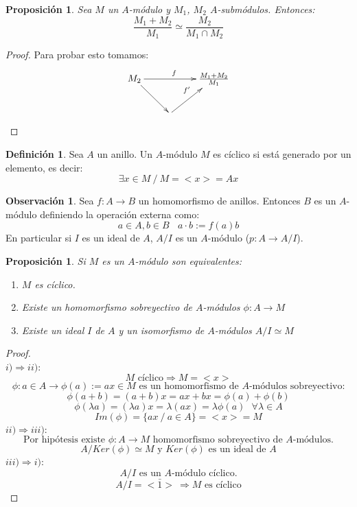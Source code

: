 \documentclass{article}
\theoremstyle{theorem-style}  %
\newtheorem{proposition}[theorem]{Proposición}
\theoremstyle{definition}
\newtheorem{definition}{Definición}[section]
\newtheorem*{observation}{Observación} %
\theoremstyle{example-style}
\begin{document}
\begin{proposition}
	Sea $M$ un $A$-módulo y $M_1$, $M_2$ $A$-submódulos. Entonces:
	\[\frac{M_1+M_2}{M_1}\simeq \frac{M_2}{M_1\cap M_2}\]
\end{proposition}
\begin{proof}
	Para probar esto tomamos:
	\[
	\xymatrix{
		M_2 \ar[rr]^f \ar[rd] & & \frac{M_1+M_2}{M_1} \\
		& \ar[ru]^{f'} \\
	}
	\]
\end{proof}
\begin{definition}
	Sea $A$ un anillo. Un $A$-módulo $M$ es cíclico si está generado por un elemento, es decir:
	\[\exists x  \in M \ / \   M=<x>=Ax\]
\end{definition}

\begin{observation}
	Sea $f:A\rightarrow B$ un homomorfismo de anillos. Entonces $B$ es un $A$-módulo definiendo la operación
	externa como:\[
		a\in A,b\in B \ \ \ \ a\cdot b :=f(a)b
	\]
	En particular si $I$ es un ideal de $A$, $A/I$ es un $A$-módulo ($p:A\rightarrow A/I$).
\end{observation}

\begin{proposition}
	Si $M$ es un $A$-módulo son equivalentes:
	\begin{enumerate}[\hspace{1cm}i)]
		\item $M$ es cíclico.
		\item Existe un homomorfismo sobreyectivo de $A$-módulos $\phi :A\rightarrow M$
		\item Existe un ideal $I$ de $A$ y un isomorfismo de $A$-módulos $A/I \simeq M$
	\end{enumerate}
\end{proposition}

\begin{proof} \ \\
	$i)\Rightarrow ii)$:
	\[ M \text{ cíclico}\Rightarrow M=<x>\]
	\[ \phi :a \in A\rightarrow \phi (a):=ax \in M \text{ es un homomorfismo de $A$-módulos sobreyectivo:}\]
	\[ \phi(a+b)=(a+b)x=ax+bx=\phi(a)+\phi(b)\]
	\[ \phi(\lambda a)=(\lambda a)x= \lambda(ax)=\lambda\phi(a) \ \ \ \forall\lambda\in A \]
	\[ Im(\phi)=\{ax \ / \ a\in A \} = <x>=M\]
	$ii)\Rightarrow iii)$:
	\[ \text{Por hipótesis existe } \phi:A\rightarrow M \text{ homomorfismo sobreyectivo de $A$-módulos.}\]
	\[ A/Ker(\phi) \simeq M \text{ y $Ker(\phi)$ es un ideal de } A \]
	$iii)\Rightarrow i)$:
	\[ A/I \text{ es un $A$-módulo cíclico.} \]
	\[ A/I=<\bar{1}>\ \Rightarrow\text{$M$ es cíclico} \]
\end{proof}
\end{document}
